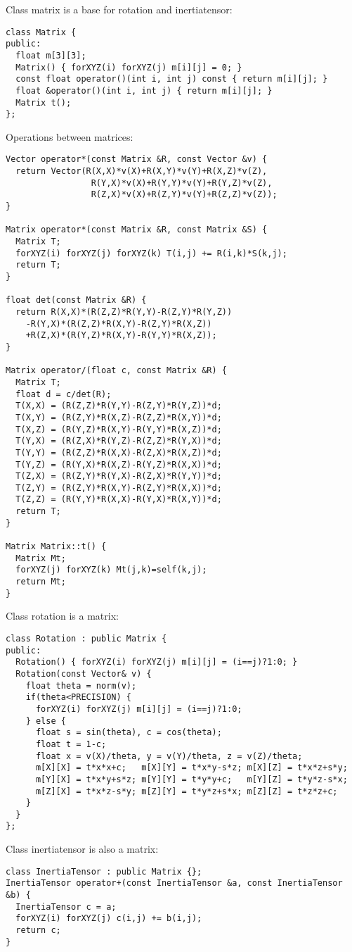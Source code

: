 \noindent
Class matrix is a base for rotation and inertiatensor: \begin{lstlisting}
class Matrix {
public:
  float m[3][3];
  Matrix() { forXYZ(i) forXYZ(j) m[i][j] = 0; }
  const float operator()(int i, int j) const { return m[i][j]; }
  float &operator()(int i, int j) { return m[i][j]; }
  Matrix t();
};
\end{lstlisting}
\noindent
Operations between matrices: \begin{lstlisting}
Vector operator*(const Matrix &R, const Vector &v) {
  return Vector(R(X,X)*v(X)+R(X,Y)*v(Y)+R(X,Z)*v(Z),
                 R(Y,X)*v(X)+R(Y,Y)*v(Y)+R(Y,Z)*v(Z),
                 R(Z,X)*v(X)+R(Z,Y)*v(Y)+R(Z,Z)*v(Z));
}

Matrix operator*(const Matrix &R, const Matrix &S) {
  Matrix T;
  forXYZ(i) forXYZ(j) forXYZ(k) T(i,j) += R(i,k)*S(k,j);
  return T;
}

float det(const Matrix &R) {
  return R(X,X)*(R(Z,Z)*R(Y,Y)-R(Z,Y)*R(Y,Z))
    -R(Y,X)*(R(Z,Z)*R(X,Y)-R(Z,Y)*R(X,Z))
    +R(Z,X)*(R(Y,Z)*R(X,Y)-R(Y,Y)*R(X,Z));
}

Matrix operator/(float c, const Matrix &R) {
  Matrix T;
  float d = c/det(R);
  T(X,X) = (R(Z,Z)*R(Y,Y)-R(Z,Y)*R(Y,Z))*d;
  T(X,Y) = (R(Z,Y)*R(X,Z)-R(Z,Z)*R(X,Y))*d;
  T(X,Z) = (R(Y,Z)*R(X,Y)-R(Y,Y)*R(X,Z))*d;
  T(Y,X) = (R(Z,X)*R(Y,Z)-R(Z,Z)*R(Y,X))*d;
  T(Y,Y) = (R(Z,Z)*R(X,X)-R(Z,X)*R(X,Z))*d;
  T(Y,Z) = (R(Y,X)*R(X,Z)-R(Y,Z)*R(X,X))*d;
  T(Z,X) = (R(Z,Y)*R(Y,X)-R(Z,X)*R(Y,Y))*d;
  T(Z,Y) = (R(Z,Y)*R(X,Y)-R(Z,Y)*R(X,X))*d;
  T(Z,Z) = (R(Y,Y)*R(X,X)-R(Y,X)*R(X,Y))*d;
  return T;
}

Matrix Matrix::t() {
  Matrix Mt;
  forXYZ(j) forXYZ(k) Mt(j,k)=self(k,j);
  return Mt;
}
\end{lstlisting}
\noindent
Class rotation is a matrix: \begin{lstlisting}
class Rotation : public Matrix {
public:
  Rotation() { forXYZ(i) forXYZ(j) m[i][j] = (i==j)?1:0; }
  Rotation(const Vector& v) {
    float theta = norm(v);
    if(theta<PRECISION) {
      forXYZ(i) forXYZ(j) m[i][j] = (i==j)?1:0;
    } else {
      float s = sin(theta), c = cos(theta);
      float t = 1-c;
      float x = v(X)/theta, y = v(Y)/theta, z = v(Z)/theta;
      m[X][X] = t*x*x+c;   m[X][Y] = t*x*y-s*z; m[X][Z] = t*x*z+s*y;
      m[Y][X] = t*x*y+s*z; m[Y][Y] = t*y*y+c;   m[Y][Z] = t*y*z-s*x;
      m[Z][X] = t*x*z-s*y; m[Z][Y] = t*y*z+s*x; m[Z][Z] = t*z*z+c;
    }
  }
};
\end{lstlisting}
\noindent
Class inertiatensor is also a matrix: \begin{lstlisting}
class InertiaTensor : public Matrix {};
InertiaTensor operator+(const InertiaTensor &a, const InertiaTensor &b) {
  InertiaTensor c = a;
  forXYZ(i) forXYZ(j) c(i,j) += b(i,j);
  return c;
}
\end{lstlisting}
